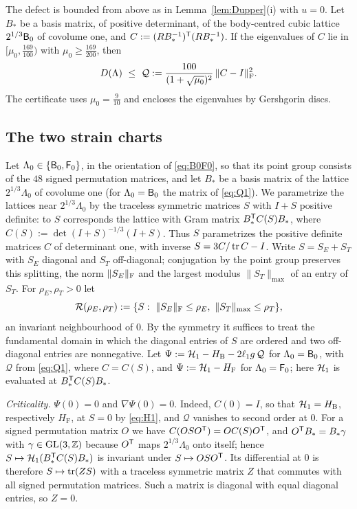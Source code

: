 The defect is bounded from above as in Lemma~\ref{lem:Dupper}(i) with $u=0$. Let $B_\ast$ be a basis matrix, of positive determinant,
of the body-centred cubic lattice $2^{1/3}\mathsf B_0$ of covolume one, and $C:=(RB_\ast^{-1})^\mathsf T(RB_\ast^{-1})$. If the eigenvalues
of $C$ lie in $[\mu_0,\frac{169}{100})$ with $\mu_0\ge\frac{169}{200}$, then
\begin{equation}\label{eq:Q1}
  D(\Lambda)\ \le\ \mathcal Q:=\frac{100}{(1+\sqrt{\mu_0})^2}\,\|C-I\|_\mathrm F^2 .
\end{equation}
The certificate uses $\mu_0=\frac9{10}$ and encloses the eigenvalues by Gershgorin discs.

\subsection{The two strain charts}\label{ssec:strain}

Let $\Lambda_0\in\{\mathsf B_0,\mathsf F_0\}$, in the orientation of \eqref{eq:B0F0}, so that its point group consists of the $48$ signed
permutation matrices, and let $B_\ast$ be a basis matrix of the lattice $2^{1/3}\Lambda_0$ of covolume one (for $\Lambda_0=\mathsf B_0$ the
matrix of \eqref{eq:Q1}). We parametrize the lattices near $2^{1/3}\Lambda_0$ by the traceless symmetric matrices $S$ with $I+S$
positive definite: to $S$ corresponds the lattice with Gram matrix
$B_\ast^\mathsf T C(S)B_\ast$, where $C(S):=\det(I+S)^{-1/3}(I+S)$. Thus $S$ parametrizes the positive definite matrices $C$ of
determinant one, with inverse $S=3C/\operatorname{tr} C-I$. Write
$S=S_E+S_T$ with $S_E$ diagonal and $S_T$ off-diagonal; conjugation by the point group preserves this splitting, the norm
$\|S_E\|_\mathrm F$ and the largest modulus $\|S_T\|_{\max}$ of an entry of $S_T$. For $\rho_E,\rho_T>0$ let
\[
  \mathcal R(\rho_E,\rho_T):=\{S:\ \|S_E\|_\Fro\le\rho_E,\ \|S_T\|_{\max}\le\rho_T\},
\]
an invariant neighbourhood of $0$. By the symmetry it suffices to treat the fundamental domain in which the diagonal entries
of $S$ are ordered and two off-diagonal entries are nonnegative. Let $\Psi:=\mathcal H_1-H_\mathrm B-2\ell_1g\,\mathcal Q$ for
$\Lambda_0=\mathsf B_0$, with $\mathcal Q$ from \eqref{eq:Q1}, where $C=C(S)$, and $\Psi:=\mathcal H_1-H_\mathrm F$ for $\Lambda_0=\mathsf F_0$; here
$\mathcal H_1$ is evaluated at $B_\ast^\mathsf T C(S)B_\ast$.

\emph{Criticality.} $\Psi(0)=0$ and $\nabla\Psi(0)=0$. Indeed, $C(0)=I$, so that $\mathcal H_1=H_\mathrm B$, respectively $H_\mathrm F$,
at $S=0$ by \eqref{eq:H1}, and $\mathcal Q$ vanishes to second order at $0$. For a signed permutation matrix $O$ we have
$C(OSO^\mathsf T)=OC(S)O^\mathsf T$, and $O^\mathsf T B_\ast=B_\ast\gamma$ with $\gamma\in\mathrm{GL}(3,\mathbb Z)$ because $O^\mathsf T$ maps $2^{1/3}\Lambda_0$ onto
itself; hence $S\mapsto\mathcal H_1(B_\ast^\mathsf T C(S)B_\ast)$ is invariant under $S\mapsto OSO^\mathsf T$. Its differential at $0$ is therefore
$S\mapsto\operatorname{tr}(ZS)$ with a traceless symmetric matrix $Z$ that commutes with all signed permutation matrices. Such a matrix is
diagonal with equal diagonal entries, so $Z=0$.

